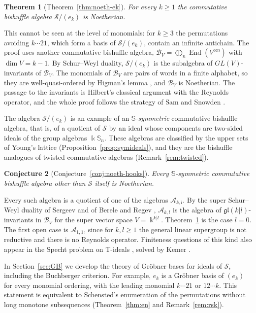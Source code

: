 \documentclass[11pt]{amsart}
\newtheorem{introtheorem}{Theorem}
\newtheorem{introconjecture}[introtheorem]{Conjecture}
\theoremstyle{definition}
\theoremstyle{remark}
\newcommand{\bS}{\mathbb{S}}
\newcommand{\kk}{\Bbbk}
\newcommand{\cA}{\mathscr{A}}
\newcommand{\cB}{\mathcal{B}}
\newcommand{\cS}{\mathscr{S}}
\newcommand{\End}{\operatorname{End}}
\begin{document}
\begin{introtheorem}[Theorem~\ref{thm:noeth-ek}]\label{introthm:noeth}
For every $k\ge1$ the commutative bishuffle algebra $\cS/(e_k)$ is Noetherian.
\end{introtheorem}

This cannot be seen at the level of monomials: for $k\ge3$ the permutations avoiding $k\cdots21$, which form a basis of $\cS/(e_k)$, contain an infinite antichain. The proof uses another commutative bishuffle algebra, $\cB_V=\bigoplus_n\End(V^{\otimes n})$ with $\dim V=k-1$. By Schur--Weyl duality, $\cS/(e_k)$ is the subalgebra of $GL(V)$-invariants of $\cB_V$. The monomials of $\cB_V$ are pairs of words in a finite alphabet, so they are well-quasi-ordered by Higman's lemma \cite{Higman}, and $\cB_V$ is Noetherian. The passage to the invariants is Hilbert's classical argument with the Reynolds operator, and the whole proof follows the strategy of Sam and Snowden \cite{SS}.

The algebra $\cS/(e_k)$ is an example of an \emph{$\bS$-symmetric} commutative bishuffle algebra, that is, of a quotient of $\cS$ by an ideal whose components are two-sided ideals of the group algebras $\kk\bS_n$. These algebras are classified by the upper sets of Young's lattice (Proposition~\ref{prop:symideals}), and they are the bishuffle analogues of twisted commutative algebras (Remark~\ref{rem:twisted}).

\begin{introconjecture}[Conjecture~\ref{conj:noeth-hooks}]\label{introconj:noeth}
Every $\bS$-symmetric commutative bishuffle algebra other than $\cS$ itself is Noetherian.
\end{introconjecture}

Every such algebra is a quotient of one of the algebras $\cA_{k,l}$. By the super Schur--Weyl duality of Sergeev and of Berele and Regev \cite{Sergeev,BR}, $\cA_{k,l}$ is the algebra of $\mathfrak{gl}(k|l)$-invariants in $\cB_V$ for the super vector space $V=\kk^{k|l}$. Theorem~\ref{introthm:noeth} is the case $l=0$. The first open case is $\cA_{1,1}$, since for $k,l\ge1$ the general linear supergroup is not reductive and there is no Reynolds operator. Finiteness questions of this kind also appear in the Specht problem on T-ideals \cite{Specht}, solved by Kemer \cite{Kemer87,Kemer91}.

In Section~\ref{sec:GB} we develop the theory of Gr\"obner bases for ideals of $\cS$, including the Buchberger criterion. For example, $e_k$ is a Gr\"obner basis of $(e_k)$ for every monomial ordering, with the leading monomial $k\cdots21$ or $12\cdots k$. This statement is equivalent to Schensted's enumeration of the permutations without long monotone subsequences \cite{Schensted} (Theorem~\ref{thm:en} and Remark~\ref{rem:rsk}).
\end{document}
